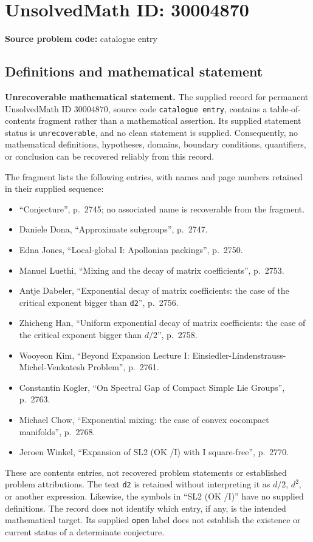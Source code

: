 \documentclass[11pt]{article}
\begin{document}
\section*{UnsolvedMath ID: 30004870}
\textbf{Source problem code:} catalogue entry
\subsection{Definitions and mathematical statement}
\textbf{Unrecoverable mathematical statement.} The supplied record for permanent UnsolvedMath ID \(30004870\), source code \texttt{catalogue entry}, contains a table-of-contents fragment rather than a mathematical assertion. Its supplied statement status is \texttt{unrecoverable}, and no clean statement is supplied. Consequently, no mathematical definitions, hypotheses, domains, boundary conditions, quantifiers, or conclusion can be recovered reliably from this record.

The fragment lists the following entries, with names and page numbers retained in their supplied sequence:
\begin{itemize}
\item ``Conjecture'', p.~2745; no associated name is recoverable from the fragment.
\item Daniele Dona, ``Approximate subgroups'', p.~2747.
\item Edna Jones, ``Local-global I: Apollonian packings'', p.~2750.
\item Manuel Luethi, ``Mixing and the decay of matrix coefficients'', p.~2753.
\item Antje Dabeler, ``Exponential decay of matrix coefficients: the case of the critical exponent bigger than \texttt{d2}'', p.~2756.
\item Zhicheng Han, ``Uniform exponential decay of matrix coefficients: the case of the critical exponent bigger than \(d/2\)'', p.~2758.
\item Wooyeon Kim, ``Beyond Expansion Lecture I: Einsiedler-Lindenstrauss-Michel-Venkatesh Problem'', p.~2761.
\item Constantin Kogler, ``On Spectral Gap of Compact Simple Lie Groups'', p.~2763.
\item Michael Chow, ``Exponential mixing: the case of convex cocompact manifolds'', p.~2768.
\item Jeroen Winkel, ``Expansion of SL2 (OK /I) with I square-free'', p.~2770.
\end{itemize}
These are contents entries, not recovered problem statements or established problem attributions. The text \texttt{d2} is retained without interpreting it as \(d/2\), \(d^2\), or another expression. Likewise, the symbols in ``SL2 (OK /I)'' have no supplied definitions. The record does not identify which entry, if any, is the intended mathematical target. Its supplied \texttt{open} label does not establish the existence or current status of a determinate conjecture.
\end{document}
